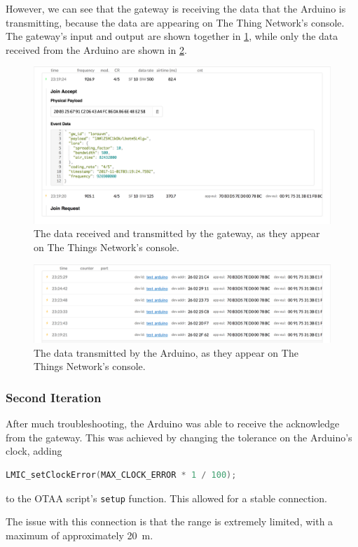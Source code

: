 However, we can see that the gateway is receiving the data that the Arduino is transmitting, because the data are appearing on The Thing Network's console.
The gateway's input and output are shown together in \cref{fig:gateway_console}, while only the data received from the Arduino are shown in \cref{fig:arduino_console}.
\begin{figure}[ht]
  \centering
  \includegraphics[width=\textwidth]{figure/gateway_console}
  \caption{The data received and transmitted by the gateway, as they appear on The Things Network's console.}
  \label{fig:gateway_console}
\end{figure}
\begin{figure}[ht]
  \centering
  \includegraphics[width=\textwidth]{figure/arduino_console}
  \caption{The data transmitted by the Arduino, as they appear on The Things Network's console.}
  \label{fig:arduino_console}
\end{figure}

\subsubsection{Second Iteration}
After much troubleshooting, the Arduino was able to receive the acknowledge from the gateway.
This was achieved by changing the tolerance on the Arduino's clock, adding
\begin{lstlisting}[language=C++]
  LMIC_setClockError(MAX_CLOCK_ERROR * 1 / 100);
\end{lstlisting}
to the OTAA script's \lstinline[language=C++]{setup} function.
This allowed for a stable connection.

The issue with this connection is that the range is extremely limited, with a maximum of approximately \SI{20}{\meter}.

